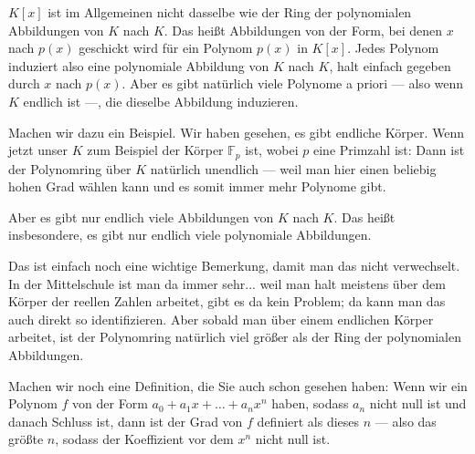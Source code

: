 \begin{spoken-clean}[00:04:30 - 00:06:20]
$K[x]$ ist im Allgemeinen nicht dasselbe wie der Ring der polynomialen Abbildungen von $K$ nach $K$. Das heißt Abbildungen von der Form, bei denen $x$ nach $p(x)$ geschickt wird für ein Polynom $p(x)$ in $K[x]$. Jedes Polynom induziert also eine polynomiale Abbildung von $K$ nach $K$, halt einfach gegeben durch $x$ nach $p(x)$. Aber es gibt natürlich viele Polynome a priori --- also wenn $K$ endlich ist ---, die dieselbe Abbildung induzieren.

Machen wir dazu ein Beispiel. Wir haben gesehen, es gibt endliche Körper. Wenn jetzt unser $K$ zum Beispiel der Körper $\mathbb{F}_p$ ist, wobei $p$ eine Primzahl ist: Dann ist der Polynomring über $K$ natürlich unendlich --- weil man hier einen beliebig hohen Grad wählen kann und es somit immer mehr Polynome gibt.

Aber es gibt nur endlich viele Abbildungen von $K$ nach $K$. Das heißt insbesondere, es gibt nur endlich viele polynomiale Abbildungen.
\end{spoken-clean}

\begin{math-stroke}
\end{math-stroke}

\begin{spoken-clean}[00:06:20 - 00:08:00]
Das ist einfach noch eine wichtige Bemerkung, damit man das nicht verwechselt. In der Mittelschule ist man da immer sehr... weil man halt meistens über dem Körper der reellen Zahlen arbeitet, gibt es da kein Problem; da kann man das auch direkt so identifizieren. Aber sobald man über einem endlichen Körper arbeitet, ist der Polynomring natürlich viel größer als der Ring der polynomialen Abbildungen.

Machen wir noch eine Definition, die Sie auch schon gesehen haben: Wenn wir ein Polynom $f$ von der Form $a_0 + a_1 x + \dots + a_n x^n$ haben, sodass $a_n$ nicht null ist und danach Schluss ist, dann ist der Grad von $f$ definiert als dieses $n$ --- also das größte $n$, sodass der Koeffizient vor dem $x^n$ nicht null ist.
\end{spoken-clean}


